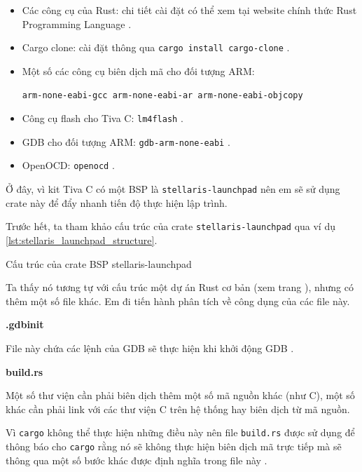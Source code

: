 \begin{itemize}
    \item Các công cụ của Rust: chi tiết cài đặt có thể xem tại website chính thức Rust Programming Language \cite{rust_website}.
    \item Cargo clone: cài đặt thông qua \texttt{cargo install cargo-clone} \cite{cargo_clone}.
    \item Một số các công cụ biên dịch mã cho đối tượng ARM:

    \texttt{arm-none-eabi-gcc arm-none-eabi-ar arm-none-eabi-objcopy}
    \item Công cụ flash cho Tiva C: \texttt{lm4flash} \cite{lm4tools}.
    \item GDB cho đối tượng ARM: \texttt{gdb-arm-none-eabi} \cite{gdb_website}.
    \item OpenOCD: \texttt{openocd} \cite{openocd_website}.
\end{itemize}

Ở đây, vì kit Tiva C có một BSP là \texttt{stellaris-launchpad} \cite{stellaris_launchpad_bsp} nên em sẽ sử dụng crate này để đẩy nhanh tiến độ thực hiện lập trình. \label{lbl:tivac_bsp}

Trước hết, ta tham khảo cấu trúc của crate \texttt{stellaris-launchpad} qua ví dụ \ref{lst:stellaris_launchpad_structure}.

\begin{listing}
\caption{Cấu trúc của crate BSP stellaris-launchpad}
\label{lst:stellaris_launchpad_structure}
\end{listing}

Ta thấy nó tương tự với cấu trúc một dự án Rust cơ bản (xem trang \pageref{lbl:basic_rust_proj_structure}), nhưng có thêm một số file khác.
Em đi tiến hành phân tích về công dụng của các file này.

\textbf{.gdbinit}

File này chứa các lệnh của GDB sẽ thực hiện khi khởi động GDB \cite{gdbinit}.

\textbf{build.rs}

Một số thư viện cần phải biên dịch thêm một số mã nguồn khác (như C), một số khác cần phải link với các thư viện C trên hệ thống hay biên dịch từ mã nguồn.

Vì \texttt{cargo} không thể thực hiện những điều này nên file \texttt{build.rs} được sử dụng để thông báo cho \texttt{cargo} rằng nó sẽ không thực hiện biên dịch mã trực tiếp mà sẽ thông qua một số bước khác được định nghĩa trong file này \cite{cargo_book}.

